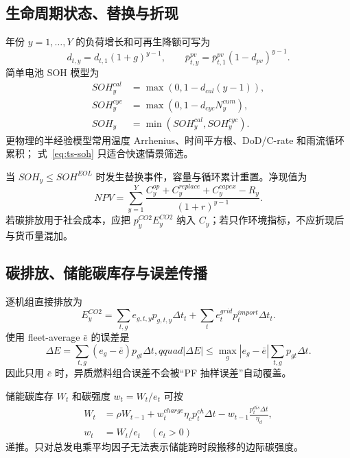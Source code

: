 \subsection{生命周期状态、替换与折现}
年份 $y=1,\ldots,Y$ 的负荷增长和可再生降额可写为
\begin{equation}
d_{t,y}=d_{t,1}(1+g)^{y-1},\qquad
\bar p_{t,y}^{pv}=\bar p_{t,1}^{pv}(1-d_{pv})^{y-1}.\label{eq:ts-growth}
\end{equation}
简单电池 SOH 模型为
\begin{align}
SOH_y^{cal}&=\max(0,1-d_{cal}(y-1)),\\
SOH_y^{cyc}&=\max(0,1-d_{cyc}N_y^{cum}),\\
SOH_y&=\min(SOH_y^{cal},SOH_y^{cyc}).\label{eq:ts-soh}
\end{align}
更物理的半经验模型常用温度 Arrhenius、时间平方根、DoD/C-rate 和雨流循环累积；
式~\eqref{eq:ts-soh} 只适合快速情景筛选。

当 $SOH_y\le SOH^{EOL}$ 时发生替换事件，容量与循环累计重置。净现值为
\begin{equation}
NPV=\sum_{y=1}^{Y}\frac{C_y^{op}+C_y^{replace}+C_y^{capex}-R_y}{(1+r)^{y-1}}.
\label{eq:ts-npv}
\end{equation}
若碳排放用于社会成本，应把 $p_y^{CO2}E_y^{CO2}$ 纳入 $C_y$；若只作环境指标，不应折现后与货币量混加。

\subsection{碳排放、储能碳库存与误差传播}
逐机组直接排放为
\begin{equation}
E_y^{CO2}=\sum_{t,g}e_{g,t,y}p_{g,t,y}\Delta t_t
+\sum_te_t^{grid}p_t^{import}\Delta t_t.\label{eq:ts-carbon}
\end{equation}
使用 fleet-average $\bar e$ 的误差是
\begin{equation}
\Delta E=\sum_{t,g}(e_g-\bar e)p_{gt}\Delta t,qquad
|\Delta E|\le \max_g|e_g-\bar e|\sum_{t,g}p_{gt}\Delta t.\label{eq:ts-carbon-average}
\end{equation}
因此只用 $\bar e$ 时，异质燃料组合误差不会被“PF 抽样误差”自动覆盖。

储能碳库存 $W_t$ 和碳强度 $w_t=W_t/e_t$ 可按
\begin{align}
W_t&=\rho W_{t-1}+w_t^{charge}\eta_cp_t^{ch}\Delta t
-w_{t-1}\frac{p_t^{dis}\Delta t}{\eta_d},\label{eq:ts-carbon-storage}\\
w_t&=W_t/e_t\quad(e_t>0)
\end{align}
递推。只对总发电乘平均因子无法表示储能跨时段搬移的边际碳强度。


